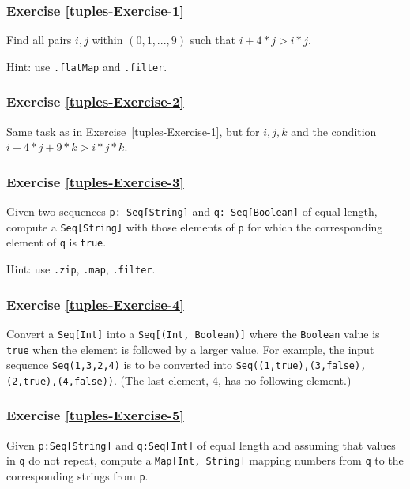 \subsubsection{Exercise \label{tuples-Exercise-1}\ref{tuples-Exercise-1}}

Find all pairs $i,j$ within $\left(0,1,...,9\right)$ such that $i+4*j>i*j$.

Hint: use \lstinline!.flatMap! and \lstinline!.filter!.

\subsubsection{Exercise \label{tuples-Exercise-2}\ref{tuples-Exercise-2}}

Same task as in Exercise~\ref{tuples-Exercise-1}, but for $i,j,k$
and the condition $i+4*j+9*k>i*j*k$.

\subsubsection{Exercise \label{tuples-Exercise-3}\ref{tuples-Exercise-3}}

Given two sequences \lstinline!p: Seq[String]! and \lstinline!q: Seq[Boolean]!
of equal length, compute a \lstinline!Seq[String]! with those elements
of \lstinline!p! for which the corresponding element of \lstinline!q!
is \lstinline!true!.

Hint: use \lstinline!.zip!, \lstinline!.map!, \lstinline!.filter!.

\subsubsection{Exercise \label{tuples-Exercise-4}\ref{tuples-Exercise-4}}

Convert a \lstinline!Seq[Int]! into a \lstinline!Seq[(Int, Boolean)]!
where the \lstinline!Boolean! value is \lstinline!true! when the
element is followed by a larger value. For example, the input sequence
\lstinline!Seq(1,3,2,4)! is to be converted into \lstinline!Seq((1,true),(3,false),(2,true),(4,false))!.
(The last element, 4, has no following element.)

\subsubsection{Exercise \label{tuples-Exercise-5}\ref{tuples-Exercise-5}}

Given \lstinline!p:Seq[String]! and \lstinline!q:Seq[Int]! of equal
length and assuming that values in \lstinline!q! do not repeat, compute
a \lstinline!Map[Int, String]! mapping numbers from \lstinline!q!
to the corresponding strings from \lstinline!p!.


